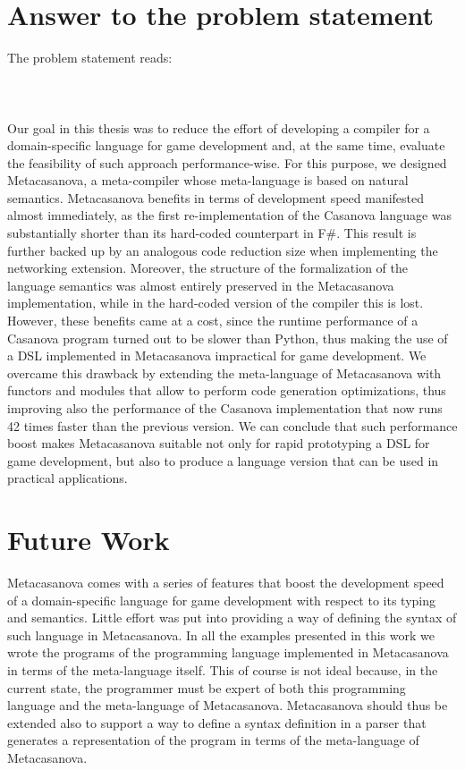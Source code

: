 \section{Answer to the problem statement}
\label{subsec:ch_conclusion_problem_statement}
The problem statement reads:\\\\
\\\\

Our goal in this thesis was to reduce the effort of developing a compiler for a domain-specific language for game development and, at the same time, evaluate the feasibility of such approach performance-wise. For this purpose, we designed Metacasanova, a meta-compiler whose meta-language is based on natural semantics. Metacasanova benefits in terms of development speed manifested almost immediately, as the first re-implementation of the Casanova language was substantially shorter than its hard-coded counterpart in F\#. This result is further backed up by an analogous code reduction size when implementing the networking extension. Moreover, the structure of the formalization of the language semantics was almost entirely preserved in the Metacasanova implementation, while in the hard-coded version of the compiler this is lost. However, these benefits came at a cost, since the runtime performance of a Casanova program turned out to be slower than Python, thus making the use of a DSL implemented in Metacasanova impractical for game development. We overcame this drawback by extending the meta-language of Metacasanova with functors and modules that allow to perform code generation optimizations, thus improving also the performance of the Casanova implementation that now runs 42 times faster than the previous version. We can conclude that such performance boost makes Metacasanova suitable not only for rapid prototyping a DSL for game development, but also to produce a language version that can be used in practical applications.

\section{Future Work}
\label{sec:ch_conclusion_future_work}
Metacasanova comes with a series of features that boost the development speed of a domain-specific language for game development with respect to its typing and semantics. Little effort was put into providing a way of defining the syntax of such language in Metacasanova. In all the examples presented in this work we wrote the programs of the programming language implemented in Metacasanova in terms of the meta-language itself. This of course is not ideal because, in the current state, the programmer must be expert of both this programming language and the meta-language of Metacasanova. Metacasanova should thus be extended also to support a way to define a syntax definition in a parser that generates a representation of the program in terms of the meta-language of Metacasanova.

